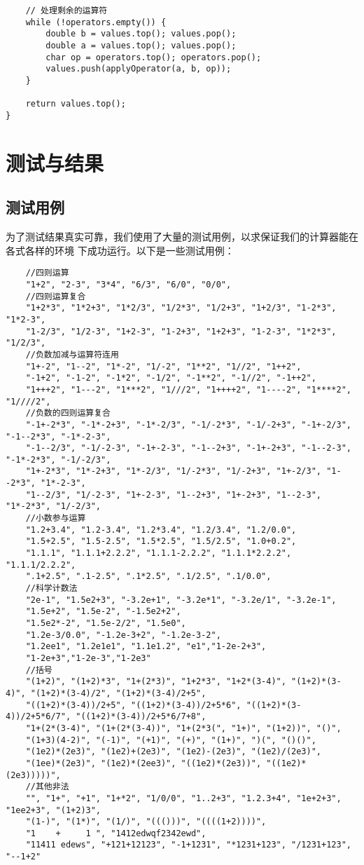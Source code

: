 \documentclass[UTF8]{ctexart}
\begin{document}
\begin{lstlisting}
    // 处理剩余的运算符
    while (!operators.empty()) {
        double b = values.top(); values.pop();
        double a = values.top(); values.pop();
        char op = operators.top(); operators.pop();
        values.push(applyOperator(a, b, op));
    }

    return values.top();
}
\end{lstlisting}
\section{测试与结果}
\subsection{测试用例}
为了测试结果真实可靠，我们使用了大量的测试用例，以求保证我们的计算器能在各式各样的环境
下成功运行。以下是一些测试用例：
\begin{lstlisting}
    //四则运算
    "1+2", "2-3", "3*4", "6/3", "6/0", "0/0",
    //四则运算复合
    "1+2*3", "1*2+3", "1*2/3", "1/2*3", "1/2+3", "1+2/3", "1-2*3", "1*2-3",
    "1-2/3", "1/2-3", "1+2-3", "1-2+3", "1+2+3", "1-2-3", "1*2*3", "1/2/3",
    //负数加减与运算符连用
    "1+-2", "1--2", "1*-2", "1/-2", "1**2", "1//2", "1++2",
    "-1+2", "-1-2", "-1*2", "-1/2", "-1**2", "-1//2", "-1++2",
    "1+++2", "1---2", "1***2", "1///2", "1++++2", "1----2", "1****2", "1////2",
    //负数的四则运算复合
    "-1+-2*3", "-1*-2+3", "-1*-2/3", "-1/-2*3", "-1/-2+3", "-1+-2/3", "-1--2*3", "-1*-2-3",
    "-1--2/3", "-1/-2-3", "-1+-2-3", "-1--2+3", "-1+-2+3", "-1--2-3", "-1*-2*3", "-1/-2/3",
    "1+-2*3", "1*-2+3", "1*-2/3", "1/-2*3", "1/-2+3", "1+-2/3", "1--2*3", "1*-2-3",
    "1--2/3", "1/-2-3", "1+-2-3", "1--2+3", "1+-2+3", "1--2-3", "1*-2*3", "1/-2/3",
    //小数参与运算   
    "1.2+3.4", "1.2-3.4", "1.2*3.4", "1.2/3.4", "1.2/0.0",
    "1.5+2.5", "1.5-2.5", "1.5*2.5", "1.5/2.5", "1.0+0.2",
    "1.1.1", "1.1.1+2.2.2", "1.1.1-2.2.2", "1.1.1*2.2.2", "1.1.1/2.2.2",
    ".1+2.5", ".1-2.5", ".1*2.5", ".1/2.5", ".1/0.0",
    //科学计数法
    "2e-1", "1.5e2+3", "-3.2e+1", "-3.2e*1", "-3.2e/1", "-3.2e-1",
    "1.5e+2", "1.5e-2", "-1.5e2+2",
    "1.5e2*-2", "1.5e-2/2", "1.5e0",
    "1.2e-3/0.0", "-1.2e-3+2", "-1.2e-3-2",
    "1.2ee1", "1.2e1e1", "1.1e1.2", "e1","1-2e-2+3",
    "1-2e+3","1-2e-3","1-2e3"
    //括号
    "(1+2)", "(1+2)*3", "1+(2*3)", "1+2*3", "1+2*(3-4)", "(1+2)*(3-4)", "(1+2)*(3-4)/2", "(1+2)*(3-4)/2+5",
    "((1+2)*(3-4))/2+5", "((1+2)*(3-4))/2+5*6", "((1+2)*(3-4))/2+5*6/7", "((1+2)*(3-4))/2+5*6/7+8",
    "1+(2*(3-4)", "(1+(2*(3-4))", "1+(2*3(", "1+)", "(1+2))", "()",
    "(1+3)(4-2)", "(-1)", "(+1)", "(+)", "(1+)", ")(", "()()",
    "(1e2)*(2e3)", "(1e2)+(2e3)", "(1e2)-(2e3)", "(1e2)/(2e3)",
    "(1ee)*(2e3)", "(1e2)*(2ee3)", "((1e2)*(2e3))", "((1e2)*(2e3)))))",
    //其他非法
    "", "1+", "+1", "1+*2", "1/0/0", "1..2+3", "1.2.3+4", "1e+2+3", "1ee2+3", "(1+2)3",
    "(1-)", "(1*)", "(1/)", "((()))", "((((1+2))))",
    "1    +     1 ", "1412edwqf2342ewd",
    "11411 edews", "+121+12123", "-1+1231", "*1231+123", "/1231+123", "--1+2"
\end{lstlisting}
\end{document}
